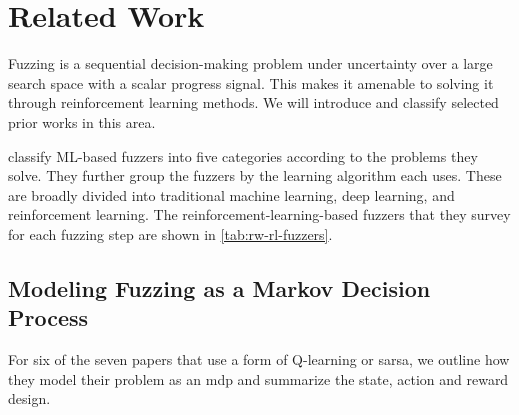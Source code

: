 
\chapter{Related Work}\label{chap:related-work}

Fuzzing is a sequential decision-making problem under uncertainty over a large search space
with a scalar progress signal.
This makes it amenable to solving it through reinforcement learning methods.
We will introduce and classify selected prior works in this area.

\textcite{wang_systematic_2020} classify ML-based fuzzers into five categories according
to the problems they solve.
They further group the fuzzers by the learning algorithm each uses.
These are broadly divided into traditional machine learning, deep learning, and reinforcement learning.
The reinforcement-learning-based fuzzers that they survey for each fuzzing step are shown in \cref{tab:rw-rl-fuzzers}.



\section{Modeling Fuzzing as a Markov Decision Process}\label{sec:rw-mdp-formulations}

For six of the seven papers that use a form of Q-learning or \gls{sarsa}, we
outline how they model their problem as an \gls{mdp} and
summarize the state, action and reward design.

